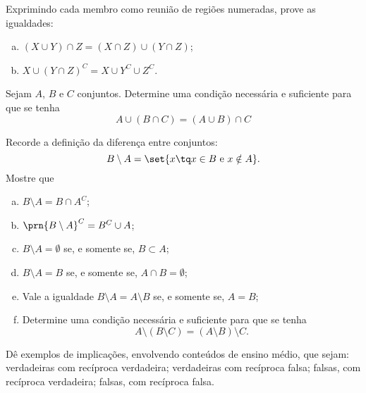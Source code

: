 \begin{exercise}
Exprimindo cada membro como reunião de regiões numeradas, prove
as igualdades:
\begin{enumerate}[a.]
  \item $\left(X \cup Y \right)\cap Z = \left(X \cap Z \right) \cup \left(Y \cap Z
  \right)$;
  \item $X \cup \left(Y \cap Z \right)^C = X \cup Y^C \cup Z^C$.
\end{enumerate}
\end{exercise}

\begin{exercise}
Sejam $A$, $B$ e $C$ conjuntos. Determine uma condição necessária e
suficiente para que se tenha 
	$$A \cup \left( B \cap C \right) = \left(A \cup B \right) \cap C$$
\end{exercise}

\begin{exercise}
Recorde a definição da diferença entre conjuntos:
  $$B \setminus A = \set {x \tq x \in B \text { e } x \notin A}.$$
  Mostre que
    \begin{enumerate}[a.]
      \item $B \setminus A = B \cap A^C$;
      \item $\prn{B \setminus A}^C = B^C\cup A$;
      \item $B \setminus A = \emptyset$ se, e somente se, $B \subset
      A$;
      \item $B \setminus A = B$ se, e somente se, $A \cap B =
      \emptyset$;
      \item Vale a igualdade $B \setminus A = A \setminus B$ se, e
      somente se, $A = B$;
      \item Determine uma condição necessária e suficiente para que
      se tenha $$A \setminus \left(B \setminus C \right) = \left(A
      \setminus B \right) \setminus C.$$
    \end{enumerate}
\end{exercise}

\begin{exercise}
Dê exemplos de implicações, envolvendo conteúdos de ensino
  médio, que sejam: verdadeiras com recíproca verdadeira;
  verdadeiras com recíproca falsa; falsas, com recíproca verdadeira;
  falsas, com recíproca falsa.
\end{exercise}

